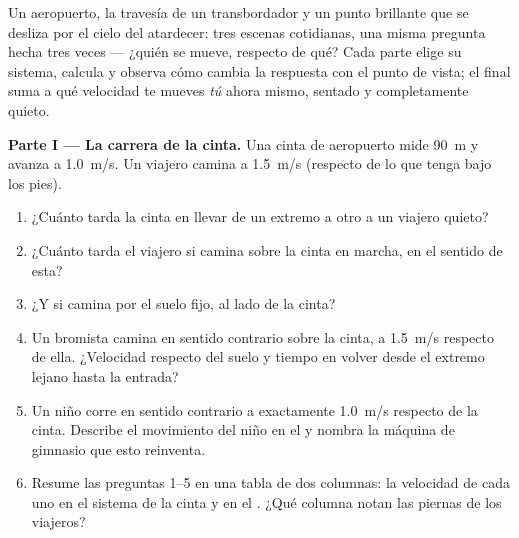 \begin{problem}
\label{pb:g10:relative-motion:1}
Un aeropuerto, la travesía de un transbordador y un punto brillante que
se desliza por el cielo del atardecer: tres escenas cotidianas, una
misma pregunta hecha tres veces --- ¿quién se mueve, respecto de qué?
Cada parte elige su sistema, calcula y observa cómo cambia la respuesta
con el punto de vista; el final suma a qué velocidad te mueves \emph{tú}
ahora mismo, sentado y completamente quieto.

\medskip
\noindent\textbf{Parte I --- La carrera de la cinta.}
Una cinta de aeropuerto mide \qty{90}{m} y avanza a \qty{1.0}{m/s}. Un
viajero camina a \qty{1.5}{m/s} (respecto de lo que tenga bajo los
pies).
\begin{enumerate}
  \item ¿Cuánto tarda la cinta en llevar de un extremo a otro a un
        viajero quieto?
  \item ¿Cuánto tarda el viajero si camina sobre la cinta en marcha, en
        el sentido de esta?
  \item ¿Y si camina por el suelo fijo, al lado de la cinta?
  \item Un bromista camina en sentido contrario sobre la cinta, a
        \qty{1.5}{m/s} respecto de ella. ¿Velocidad respecto del suelo y
        tiempo en volver desde el extremo lejano hasta la entrada?
  \item Un niño corre en sentido contrario a exactamente \qty{1.0}{m/s}
        respecto de la cinta. Describe el movimiento del niño en el
         y nombra la máquina de gimnasio que esto
        reinventa.
  \item Resume las preguntas 1--5 en una tabla de dos columnas: la
        velocidad de cada uno en el sistema de la cinta y en el . ¿Qué columna notan las piernas de los viajeros?
\end{enumerate}


\end{problem}
